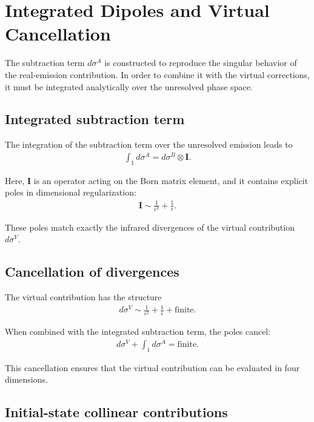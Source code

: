 \section{Integrated Dipoles and Virtual Cancellation}

The subtraction term $d\sigma^A$ is constructed to reproduce the singular
behavior of the real-emission contribution. In order to combine it with
the virtual corrections, it must be integrated analytically over the
unresolved phase space.

\subsection{Integrated subtraction term}

The integration of the subtraction term over the unresolved emission
leads to
\begin{align}
\int_1 d\sigma^A = d\sigma^B \otimes \mathbf{I}.
\end{align}

Here, $\mathbf{I}$ is an operator acting on the Born matrix element,
and it contains explicit poles in dimensional regularization:
\begin{align}
\mathbf{I} \sim \frac{1}{\epsilon^2} + \frac{1}{\epsilon}.
\end{align}

These poles match exactly the infrared divergences of the virtual
contribution $d\sigma^V$.

\subsection{Cancellation of divergences}

The virtual contribution has the structure
\begin{align}
d\sigma^V \sim \frac{1}{\epsilon^2} + \frac{1}{\epsilon} + \text{finite}.
\end{align}

When combined with the integrated subtraction term, the poles cancel:
\begin{align}
d\sigma^V + \int_1 d\sigma^A = \text{finite}.
\end{align}

This cancellation ensures that the virtual contribution can be evaluated
in four dimensions.

\subsection{Initial-state collinear contributions}

